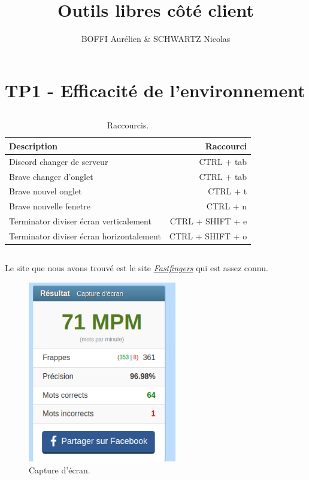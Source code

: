 \documentclass{article}
\title{Outils libres côté client}
\author{BOFFI Aurélien & SCHWARTZ Nicolas}
\begin{document}
\maketitle
\tableofcontents
\newpage

\section{TP1 - Efficacité de l'environnement}

\subsection{}

\begin{table}[h]
\centering
\begin{tabular}{l|r}

Description & Raccourci \\\hline
Discord changer de serveur  & CTRL + tab \\
\hline
Brave changer d'onglet   & CTRL + tab \\
\hline
Brave nouvel onglet   & CTRL + t \\
\hline
Brave nouvelle fenetre  & CTRL + n \\
\hline
Terminator diviser écran verticalement   & CTRL + SHIFT + e \\
\hline
Terminator diviser écran horizontalement   & CTRL + SHIFT + o \\
\hline

\end{tabular}
\caption{\label{tab:widgets}Raccourcis.}
\end{table}


\subsection{}

Le site que nous avons trouvé est le site \href{https://10fastfingers.com/typing-test/french}{\emph{Fastfingers}} qui est assez connu.

\begin{figure}[h]
\centering
    \includegraphics[height=0.7\columnwidth]{screen/Fastfingers.png}
    \caption{\label{fig:frog}Capture d'écran.}
\end{figure}
\FloatBarrier
\end{document}
